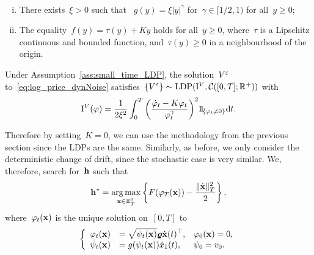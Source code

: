 \begin{assumption}\label{ass:small_time_LDP}\
\begin{enumerate}[(i)]
	\item There exists~$\xi>0$ such that ~$g(y)=\xi |y|^\gamma$ for~$\gamma \in[1 / 2,1)$ for all~$y\geq0$;
	\item The equality~$f(y)=\tau(y)+ K y$ holds for all~$y\geq0$, where~$\tau$ is a Lipschitz continuous and bounded function, and~$\tau(y) \geq 0$ in a neighbourhood of the origin.
\end{enumerate}
\end{assumption}

\begin{theorem}\label{thm:Conforti}
Under Assumption~\ref{ass:small_time_LDP}, 
the solution~$V^\varepsilon$ to~\eqref{eq:log_price_dynNoise}
satisfies~$\left\{V^{\varepsilon}\right\}\sim\mathrm{LDP}(\mathrm{I}^{V}, \mathcal{C}([0, T]; \mathbb{R}^{+}))$ with
$$
\IIV(\varphi)=\frac{1}{2 \xi^{2}} \int_{0}^{T}\left(\frac{\dot{\varphi}_{t} - K\varphi_{t}}{\varphi_{t}^{\gamma}}\right)^{2} \ind_{\left\{\varphi_{t} \neq 0\right\}} \D t.
$$
\end{theorem}
Therefore by setting~$K=0$, we can use the methodology from the previous section since the LDPs are the same. Similarly, as before, we only consider the deterministic change of drift, since the stochastic case is very similar.
We, therefore, search for~$\boldsymbol{\mathrm{h}}$ such that
$$
\boldsymbol{\mathrm{h}}^* = \operatorname*{arg\,max}\limits_{\boldsymbol{\mathrm{x}}\in \mathbb{H}_T^0} 
\left\{F(\varphi_T(\boldsymbol{\mathrm{x}})) - \frac{\|\dot{\boldsymbol{\mathrm{x}}}\|_{T}^2}{2}\right\},
$$
where~$\varphi_t(\boldsymbol{\mathrm{x}})$ is the unique solution on~$[0,T]$ to
\begin{equation*}
\left\{
\begin{array}{rll}
\varphi_t(\boldsymbol{\mathrm{x}}) & = \displaystyle \sqrt{\psi_t(\boldsymbol{\mathrm{x}})}\boldsymbol{\mathrm{\varrho}} \dot{\boldsymbol{\mathrm{x}}}(t)^\top, & \varphi_0(\boldsymbol{\mathrm{x}}) = 0,\\
\dot{\psi}_t(\boldsymbol{\mathrm{x}}) & =  \displaystyle g(\psi_t(\boldsymbol{\mathrm{x}})) \dot{x}_1(t), & \psi_0 = v_0.
\end{array}
\right.
\end{equation*}



